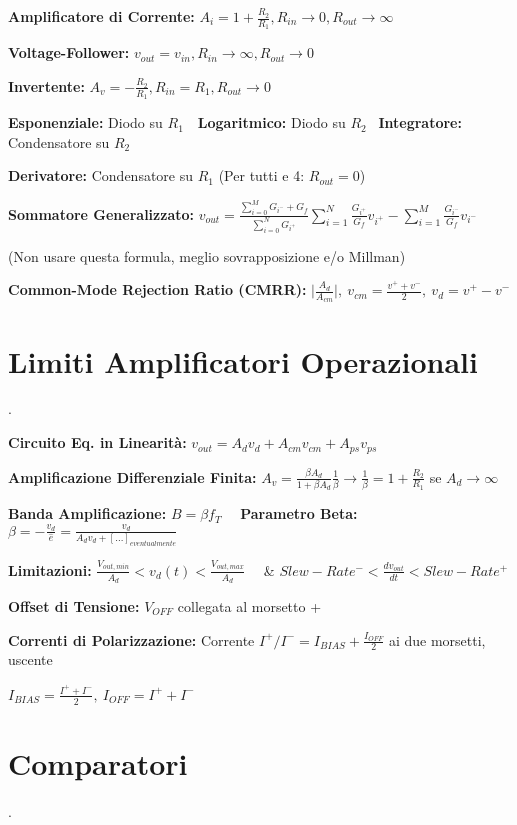 \documentclass[12pt]{extarticle}
\begin{document}
{\bf Amplificatore di Corrente:} $\displaystyle A_i = 1+\frac{R_2}{R_1}, R_{in} \to 0, R_{out} \to \infty$

{\bf Voltage-Follower:} $\displaystyle v_{out} = v_{in}, R_{in} \to \infty, R_{out} \to 0$

{\bf Invertente:} $\displaystyle A_v = -\frac{R_2}{R_1}, R_{in} = R_1, R_{out} \to 0$

{\bf Esponenziale:} Diodo su $R_1$\ \ {\bf Logaritmico:} Diodo su $R_2$ \ {\bf Integratore:} Condensatore su $R_2$

{\bf Derivatore:} Condensatore su $R_1$ (Per tutti e 4: $R_{out} = 0$)


{\bf Sommatore Generalizzato:} $\displaystyle v_{out} = \frac{\sum_{i=0}^M G_{i^-} + G_f}{\sum_{i=0}^N G_{i^+}} \sum_{i=1}^N \frac{G_{i^+}}{G_f}v_{i^+}-\sum_{i=1}^M\frac{G_{i^-}}{G_f}v_{i^-}$ 

(Non usare questa formula, meglio sovrapposizione e/o Millman)

{\bf Common-Mode Rejection Ratio (CMRR):} $\displaystyle \bigg |\frac{A_d}{A_{cm}} \bigg |, \ v_{cm} = \frac{v^++v^-}{2}, \ v_d = v^+-v^-$


\section{Limiti Amplificatori Operazionali}.

{\bf Circuito Eq. in Linearità:} $\displaystyle v_{out} = A_dv_d +A_{cm}v_{cm}+A_{ps}v_{ps}$

{\bf Amplificazione Differenziale Finita:} $\displaystyle A_v = \frac{\beta A_d}{1+\beta A_d}\frac{1}{\beta} \to \frac{1}{\beta} = 1+\frac{R_2}{R_1}$ se $A_d \to \infty$

{\bf Banda Amplificazione:} $\displaystyle B = \beta f_T$ \ \ {\bf Parametro Beta:} $\displaystyle \beta = -\frac{v_d}{\hat{e}} = \frac{v_d}{A_dv_d + [...]_{eventualmente}}$

{\bf Limitazioni:} $\displaystyle \frac{V_{out, min}}{A_d} < v_d(t) < \frac{V_{out, max}}{A_d}$ \ \ \&  $\displaystyle Slew-Rate^- < \frac{dv_{out}}{dt} < Slew-Rate^+$

{\bf Offset di Tensione:} $V_{OFF}$ collegata al morsetto +

{\bf Correnti di Polarizzazione:} Corrente $I^+/I^- = I_{BIAS}+\frac{I_{OFF}}{2}$ ai due morsetti, uscente

$\displaystyle I_{BIAS} = \frac{I^++I^-}{2}, \ I_{OFF} = I^++I^-$

\section{Comparatori}.
\end{document}
